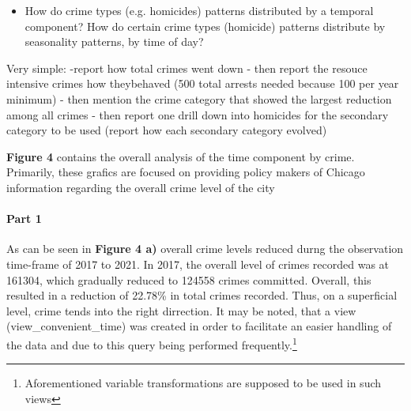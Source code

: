 \documentclass[a4paper]{article}
\begin{document}
\begin{itemize}
  \item How do crime types (e.g. homicides) patterns distributed by a temporal component? How do certain crime types (homicide) patterns distribute by seasonality patterns, by time of day?
\end{itemize}

Very simple:
-report how total crimes went down
- then report the resouce intensive crimes how theybehaved (500 total arrests needed because 100 per year minimum)
- then mention the crime category that showed the largest reduction among all crimes
- then report one drill down into homicides for the secondary category to be used (report how each secondary category evolved)

\textbf{Figure 4} contains the overall analysis of the time component by crime. Primarily, these grafics are focused on providing policy makers of Chicago information regarding the overall crime level of the city

\paragraph{Part 1} As can be seen in \textbf{Figure 4 a)} overall crime levels reduced durng the observation time-frame of 2017 to 2021. In 2017, the overall level of crimes recorded was at 161304, which gradually reduced to 124558 crimes committed. Overall, this resulted in a reduction of 22.78\% in total crimes recorded. Thus, on a superficial level, crime tends into the right dirrection. It may be noted, that a view (view_convenient_time) was created in order to facilitate an easier handling of the data and due to this query being performed frequently.\footnote{Aforementioned variable transformations are supposed to be used in such views}
\end{document}
